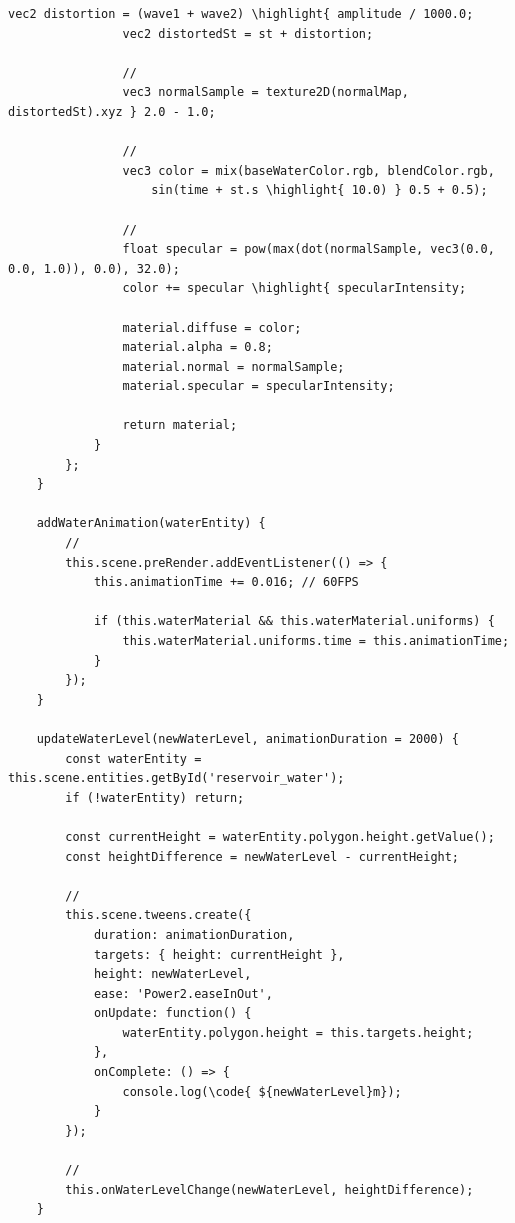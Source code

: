 \begin{lstlisting}[style=javascript]
                vec2 distortion = (wave1 + wave2) \highlight{ amplitude / 1000.0;
                vec2 distortedSt = st + distortion;
                
                // 
                vec3 normalSample = texture2D(normalMap, distortedSt).xyz } 2.0 - 1.0;
                
                // 
                vec3 color = mix(baseWaterColor.rgb, blendColor.rgb, 
                    sin(time + st.s \highlight{ 10.0) } 0.5 + 0.5);
                
                // 
                float specular = pow(max(dot(normalSample, vec3(0.0, 0.0, 1.0)), 0.0), 32.0);
                color += specular \highlight{ specularIntensity;
                
                material.diffuse = color;
                material.alpha = 0.8;
                material.normal = normalSample;
                material.specular = specularIntensity;
                
                return material;
            }
        };
    }
    
    addWaterAnimation(waterEntity) {
        // 
        this.scene.preRender.addEventListener(() => {
            this.animationTime += 0.016; // 60FPS
            
            if (this.waterMaterial && this.waterMaterial.uniforms) {
                this.waterMaterial.uniforms.time = this.animationTime;
            }
        });
    }
    
    updateWaterLevel(newWaterLevel, animationDuration = 2000) {
        const waterEntity = this.scene.entities.getById('reservoir_water');
        if (!waterEntity) return;
        
        const currentHeight = waterEntity.polygon.height.getValue();
        const heightDifference = newWaterLevel - currentHeight;
        
        // 
        this.scene.tweens.create({
            duration: animationDuration,
            targets: { height: currentHeight },
            height: newWaterLevel,
            ease: 'Power2.easeInOut',
            onUpdate: function() {
                waterEntity.polygon.height = this.targets.height;
            },
            onComplete: () => {
                console.log(\code{ ${newWaterLevel}m});
            }
        });
        
        // 
        this.onWaterLevelChange(newWaterLevel, heightDifference);
    }
    

\end{lstlisting}
